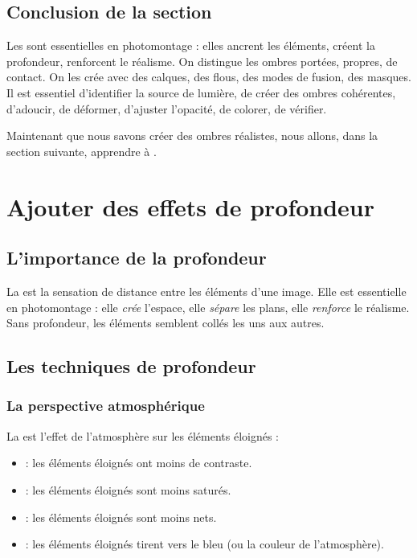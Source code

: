 \subsection*{Conclusion de la section}

Les  sont essentielles en photomontage : elles ancrent les éléments, créent la profondeur, renforcent le réalisme. On distingue les ombres portées, propres, de contact. On les crée avec des calques, des flous, des modes de fusion, des masques. Il est essentiel d'identifier la source de lumière, de créer des ombres cohérentes, d'adoucir, de déformer, d'ajuster l'opacité, de colorer, de vérifier.

Maintenant que nous savons créer des ombres réalistes, nous allons, dans la section suivante, apprendre à .

\section{Ajouter des effets de profondeur}

\subsection{L'importance de la profondeur}

La  est la sensation de distance entre les éléments d'une image. Elle est essentielle en photomontage : elle \emph{crée} l'espace, elle \emph{sépare} les plans, elle \emph{renforce} le réalisme. Sans profondeur, les éléments semblent collés les uns aux autres.

\subsection{Les techniques de profondeur}

\subsubsection{La perspective atmosphérique}

La  est l'effet de l'atmosphère sur les éléments éloignés :

\begin{itemize}
    \item {} : les éléments éloignés ont moins de contraste.
    \item {} : les éléments éloignés sont moins saturés.
    \item {} : les éléments éloignés sont moins nets.
    \item {} : les éléments éloignés tirent vers le bleu (ou la couleur de l'atmosphère).
\end{itemize}

